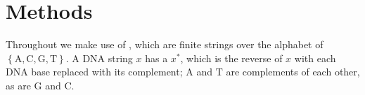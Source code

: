 




\section{Methods}






Throughout we make use of , which are finite strings over the alphabet of  $\left\{\mathrm{A}, \mathrm{C}, \mathrm{G}, \mathrm{T}\right\}$. 
A DNA string $x$ has a  $x^*$, which is the reverse of $x$ with each DNA base replaced with its complement; $\mathrm{A}$ and $\mathrm{T}$ are complements of each other, as are $\mathrm{G}$ and $\mathrm{C}$. 


